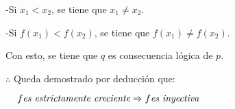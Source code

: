 \documentclass[spanish, fleqn]{article}
\begin{document}
\begin{enumerate}
-Si $x_1<x_2$, se tiene que $x_1 \neq x_2$.

-Si $f(x_1)<f(x_2)$, se tiene que $f(x_1) \neq f(x_2)$.

Con esto, se tiene que $q$ es consecuencia lógica de $p$.

$\therefore$ Queda demostrado por deducción que:

$\hspace{0.4cm} f \textit{es estrictamente creciente} \Rightarrow f \textit{es inyectiva}$
\end{enumerate}
\end{document}
